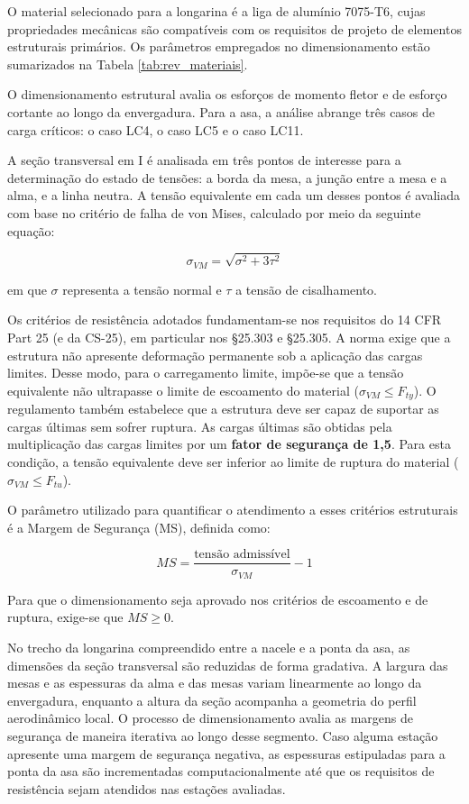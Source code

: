 O material selecionado para a longarina é a liga de alumínio 7075-T6, cujas propriedades mecânicas são compatíveis com os requisitos de projeto de elementos estruturais primários. Os parâmetros empregados no dimensionamento estão sumarizados na Tabela \ref{tab:rev_materiais}.

O dimensionamento estrutural avalia os esforços de momento fletor e de esforço cortante ao longo da envergadura. Para a asa, a análise abrange três casos de carga críticos: o caso LC4, o caso LC5 e o caso LC11.

A seção transversal em I é analisada em três pontos de interesse para a determinação do estado de tensões: a borda da mesa, a junção entre a mesa e a alma, e a linha neutra. A tensão equivalente em cada um desses pontos é avaliada com base no critério de falha de von Mises, calculado por meio da seguinte equação:

$$\sigma_{VM} = \sqrt{\sigma^2 + 3\tau^2}$$

em que $\sigma$ representa a tensão normal e $\tau$ a tensão de cisalhamento.

Os critérios de resistência adotados fundamentam-se nos requisitos do 14 CFR Part 25 (e da CS-25), em particular nos \S 25.303 e \S 25.305. A norma exige que a estrutura não apresente deformação permanente sob a aplicação das cargas limites. Desse modo, para o carregamento limite, impõe-se que a tensão equivalente não ultrapasse o limite de escoamento do material ($\sigma_{VM} \le F_{ty}$). O regulamento também estabelece que a estrutura deve ser capaz de suportar as cargas últimas sem sofrer ruptura. As cargas últimas são obtidas pela multiplicação das cargas limites por um \textbf{fator de segurança de 1,5}. Para esta condição, a tensão equivalente deve ser inferior ao limite de ruptura do material ($\sigma_{VM} \le F_{tu}$).

O parâmetro utilizado para quantificar o atendimento a esses critérios estruturais é a Margem de Segurança (MS), definida como:

$$MS = \frac{\text{tensão admissível}}{\sigma_{VM}} - 1$$

Para que o dimensionamento seja aprovado nos critérios de escoamento e de ruptura, exige-se que $MS \ge 0$.

No trecho da longarina compreendido entre a nacele e a ponta da asa, as dimensões da seção transversal são reduzidas de forma gradativa. A largura das mesas e as espessuras da alma e das mesas variam linearmente ao longo da envergadura, enquanto a altura da seção acompanha a geometria do perfil aerodinâmico local. O processo de dimensionamento avalia as margens de segurança de maneira iterativa ao longo desse segmento. Caso alguma estação apresente uma margem de segurança negativa, as espessuras estipuladas para a ponta da asa são incrementadas computacionalmente até que os requisitos de resistência sejam atendidos nas estações avaliadas.

